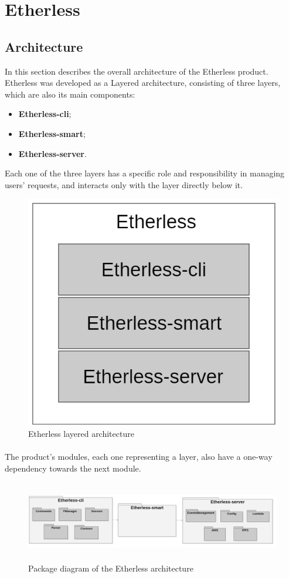 \section{Etherless}
	\subsection{Architecture} %
	In this section describes the overall architecture of the Etherless product. \\
	Etherless was developed as a Layered architecture, consisting of three layers, which are also its main components:
	\begin{itemize}
		\item \textbf{Etherless-cli};
		\item \textbf{Etherless-smart};
		\item \textbf{Etherless-server}.
	\end{itemize}
	Each one of the three layers has a specific role and responsibility in managing users' requests, and interacts only with the layer directly below it.
	\begin{figure} [h!]
		\centering
		\includegraphics[width=0.7\linewidth]{diagrammi/generali/LayeredArchitecture}
		\caption{Etherless layered architecture}
	\end{figure}
	\pagebreak
	\paragraph{} The product's modules, each one representing a layer, also have a one-way dependency towards the next module.
	\begin{figure} [h!]
		\centering
		\includegraphics[width=15cm, height=3.5cm]{diagrammi/generali/Etherless_package}
		\caption{Package diagram of the Etherless architecture}
	\end{figure}
